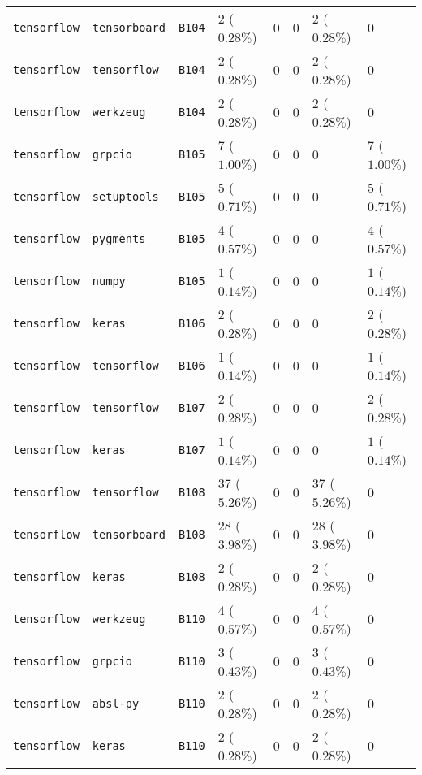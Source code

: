 \begin{table}
\begin{tabular}{llllllll}
\texttt{tensorflow} & \texttt{tensorboard} & \texttt{B104} & $2$ ($0.28\%$) & $0$ & $0$ & $2$ ($0.28\%$) & $0$ \\
\texttt{tensorflow} & \texttt{tensorflow} & \texttt{B104} & $2$ ($0.28\%$) & $0$ & $0$ & $2$ ($0.28\%$) & $0$ \\
\texttt{tensorflow} & \texttt{werkzeug} & \texttt{B104} & $2$ ($0.28\%$) & $0$ & $0$ & $2$ ($0.28\%$) & $0$ \\
\texttt{tensorflow} & \texttt{grpcio} & \texttt{B105} & $7$ ($1.00\%$) & $0$ & $0$ & $0$ & $7$ ($1.00\%$) \\
\texttt{tensorflow} & \texttt{setuptools} & \texttt{B105} & $5$ ($0.71\%$) & $0$ & $0$ & $0$ & $5$ ($0.71\%$) \\
\texttt{tensorflow} & \texttt{pygments} & \texttt{B105} & $4$ ($0.57\%$) & $0$ & $0$ & $0$ & $4$ ($0.57\%$) \\
\texttt{tensorflow} & \texttt{numpy} & \texttt{B105} & $1$ ($0.14\%$) & $0$ & $0$ & $0$ & $1$ ($0.14\%$) \\
\texttt{tensorflow} & \texttt{keras} & \texttt{B106} & $2$ ($0.28\%$) & $0$ & $0$ & $0$ & $2$ ($0.28\%$) \\
\texttt{tensorflow} & \texttt{tensorflow} & \texttt{B106} & $1$ ($0.14\%$) & $0$ & $0$ & $0$ & $1$ ($0.14\%$) \\
\texttt{tensorflow} & \texttt{tensorflow} & \texttt{B107} & $2$ ($0.28\%$) & $0$ & $0$ & $0$ & $2$ ($0.28\%$) \\
\texttt{tensorflow} & \texttt{keras} & \texttt{B107} & $1$ ($0.14\%$) & $0$ & $0$ & $0$ & $1$ ($0.14\%$) \\
\texttt{tensorflow} & \texttt{tensorflow} & \texttt{B108} & $37$ ($5.26\%$) & $0$ & $0$ & $37$ ($5.26\%$) & $0$ \\
\texttt{tensorflow} & \texttt{tensorboard} & \texttt{B108} & $28$ ($3.98\%$) & $0$ & $0$ & $28$ ($3.98\%$) & $0$ \\
\texttt{tensorflow} & \texttt{keras} & \texttt{B108} & $2$ ($0.28\%$) & $0$ & $0$ & $2$ ($0.28\%$) & $0$ \\
\texttt{tensorflow} & \texttt{werkzeug} & \texttt{B110} & $4$ ($0.57\%$) & $0$ & $0$ & $4$ ($0.57\%$) & $0$ \\
\texttt{tensorflow} & \texttt{grpcio} & \texttt{B110} & $3$ ($0.43\%$) & $0$ & $0$ & $3$ ($0.43\%$) & $0$ \\
\texttt{tensorflow} & \texttt{absl-py} & \texttt{B110} & $2$ ($0.28\%$) & $0$ & $0$ & $2$ ($0.28\%$) & $0$ \\
\texttt{tensorflow} & \texttt{keras} & \texttt{B110} & $2$ ($0.28\%$) & $0$ & $0$ & $2$ ($0.28\%$) & $0$ \\

\end{tabular}
\end{table}
